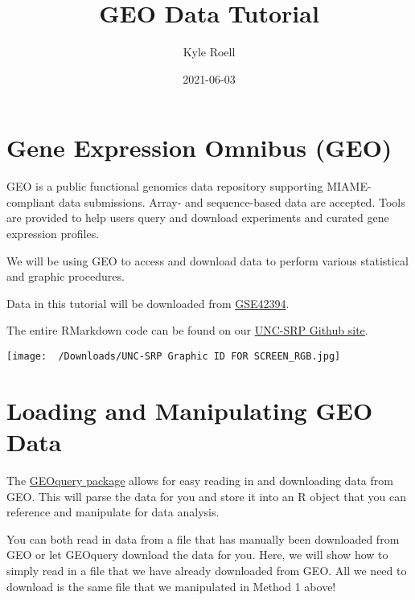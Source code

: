 \documentclass[
]{book}
\title{GEO Data Tutorial}
\author{Kyle Roell}
\date{2021-06-03}
\begin{document}
\maketitle

{
\setcounter{tocdepth}{1}
\tableofcontents
}
\hypertarget{gene-expression-omnibus-geo}{%
\chapter{Gene Expression Omnibus (GEO)}\label{gene-expression-omnibus-geo}}

GEO is a public functional genomics data repository supporting MIAME-compliant data submissions. Array- and sequence-based data are accepted. Tools are provided to help users query and download experiments and curated gene expression profiles.

We will be using GEO to access and download data to perform various statistical and graphic procedures.

Data in this tutorial will be downloaded from \href{https://www.ncbi.nlm.nih.gov/geo/query/acc.cgi?acc=GSE42394}{GSE42394}.

The entire RMarkdown code can be found on our \href{https://github.com/kyleroell/test}{UNC-SRP Github site}.

\texttt{[image: ~/Downloads/UNC-SRP Graphic ID FOR SCREEN\_RGB.jpg]}

\hypertarget{geoquery}{%
\chapter{Loading and Manipulating GEO Data}\label{geoquery}}

The \href{https://www.bioconductor.org/packages/release/bioc/html/GEOquery.html}{GEOquery package} allows for easy reading in and downloading data from GEO. This will parse the data for you and store it into an R object that you can reference and manipulate for data analysis.

You can both read in data from a file that has manually been downloaded from GEO or let GEOquery download the data for you. Here, we will show how to simply read in a file that we have already downloaded from GEO. All we need to download is the same file that we manipulated in Method 1 above!
\end{document}
